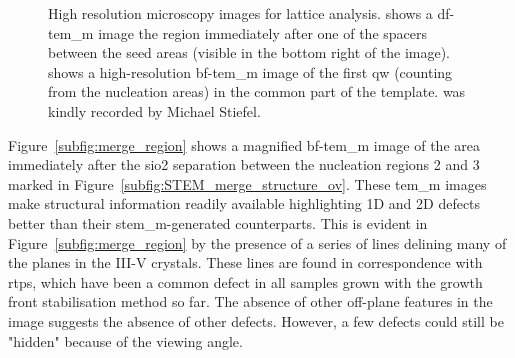 \begin{figure}
    \centering
    \caption{High resolution microscopy images for lattice analysis.  shows a \acs{df}-\acs{tem_m} image the region immediately after one of the spacers between the seed areas (visible in the bottom right of the image).  shows a high-resolution \acs{bf}-\acs{tem_m} image of the first \acl{qw} (counting from the nucleation areas) in the common part of the template.  was kindly recorded by Michael Stiefel.}
    \label{fig:merge_high-res}
\end{figure}

Figure~\ref{subfig:merge_region} shows a magnified \acs{bf}-\acs{tem_m} image of the area immediately after the \acs{sio2} separation between the nucleation regions 2 and 3 marked in Figure~\ref{subfig:STEM_merge_structure_ov}. These \acs{tem_m} images make structural information readily available highlighting 1D and 2D defects better than their \acs{stem_m}-generated counterparts. This is evident in Figure~\ref{subfig:merge_region} by the presence of a series of lines delining many of the  planes in the III-V crystals. These lines are found in correspondence with \acs{rtp}s, which have been a common defect in all samples grown with the  growth front stabilisation method so far. The absence of other off-plane features in the image suggests the absence of other defects. However, a few defects could still be "hidden" because of the viewing angle.

